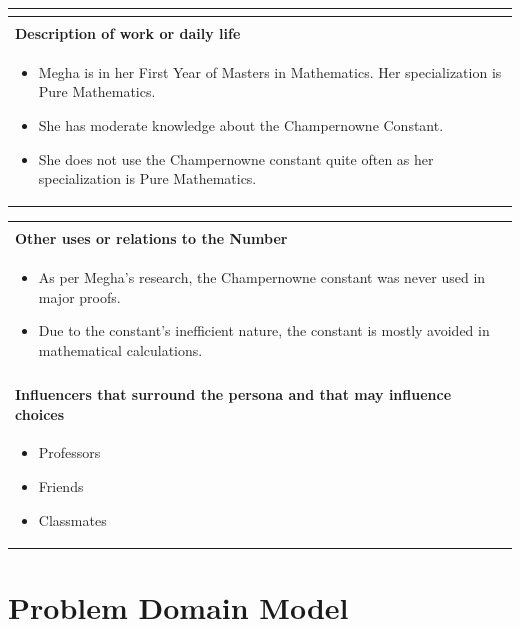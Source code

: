 \documentclass[12pt, a4paper]{report}
\begin{document}
\begin{center}
\begin{tabular}{ | m{40em} | }
\begin{itemize}
\end{itemize}
\\
\hline
\\\textbf{Description of work or daily life} \\
\begin{itemize}
    \setlength{\itemsep}{0pt}
    \item Megha is in her First Year of Masters in Mathematics. Her specialization is Pure Mathematics.
    \item She has moderate knowledge about the Champernowne Constant.
    \item She does not use the Champernowne constant quite often as her specialization is Pure Mathematics.
\end{itemize}
\\
\hline

\end{tabular}
\begin{tabular}{ | m{40em} | }
\hline
\\\textbf{Other uses or relations to the Number} \\
\begin{itemize}
     \setlength{\itemsep}{0pt}
    \item As per Megha's research, the Champernowne constant was never used in major proofs.
    \item Due to the constant's inefficient nature, the constant is mostly avoided in mathematical calculations.
\end{itemize}
\\
\hline
\\\textbf{Influencers that surround the persona and that may influence choices}\\
\begin{itemize}
    \setlength{\itemsep}{0pt}
    \item Professors
    \item Friends
    \item Classmates
\end{itemize}
\\
\hline
\end{tabular}
\end{center}

\chapter{Problem Domain Model}
\end{document}
